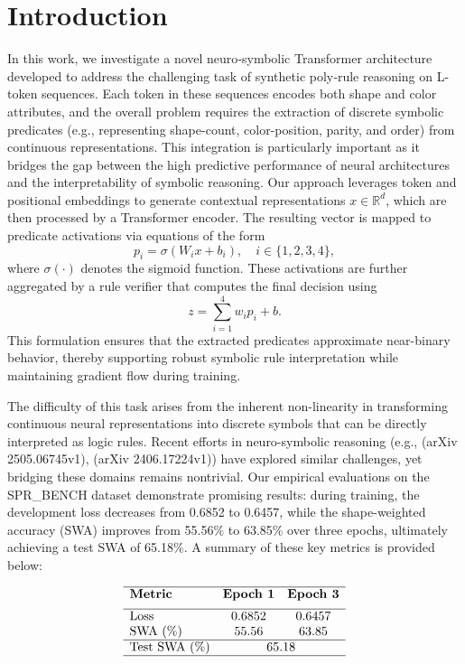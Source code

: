 \documentclass{article}
\begin{document}
\section{Introduction}
In this work, we investigate a novel neuro‐symbolic Transformer architecture developed to address the challenging task of synthetic poly‐rule reasoning on L-token sequences. Each token in these sequences encodes both shape and color attributes, and the overall problem requires the extraction of discrete symbolic predicates (e.g., representing shape-count, color-position, parity, and order) from continuous representations. This integration is particularly important as it bridges the gap between the high predictive performance of neural architectures and the interpretability of symbolic reasoning. Our approach leverages token and positional embeddings to generate contextual representations \(x \in \mathbb{R}^{d}\), which are then processed by a Transformer encoder. The resulting vector is mapped to predicate activations via equations of the form 
\[
p_i = \sigma(W_i x + b_i), \quad i \in \{1,2,3,4\},
\]
where \(\sigma(\cdot)\) denotes the sigmoid function. These activations are further aggregated by a rule verifier that computes the final decision using
\[
z = \sum_{i=1}^4 w_i p_i + b.
\]
This formulation ensures that the extracted predicates approximate near-binary behavior, thereby supporting robust symbolic rule interpretation while maintaining gradient flow during training.

The difficulty of this task arises from the inherent non-linearity in transforming continuous neural representations into discrete symbols that can be directly interpreted as logic rules. Recent efforts in neuro-symbolic reasoning (e.g., (arXiv 2505.06745v1), (arXiv 2406.17224v1)) have explored similar challenges, yet bridging these domains remains nontrivial. Our empirical evaluations on the SPR\_BENCH dataset demonstrate promising results: during training, the development loss decreases from 0.6852 to 0.6457, while the shape-weighted accuracy (SWA) improves from 55.56\% to 63.85\% over three epochs, ultimately achieving a test SWA of 65.18\%. A summary of these key metrics is provided below:

\[
\begin{array}{lcc}
\hline
\textbf{Metric} & \textbf{Epoch 1} & \textbf{Epoch 3} \\[0.5em]
\hline
\text{Loss} & 0.6852 & 0.6457 \\
\text{SWA (\%)} & 55.56 & 63.85 \\
\hline
\text{Test SWA (\%)} & \multicolumn{2}{c}{65.18} \\
\hline
\end{array}
\]
\end{document}

